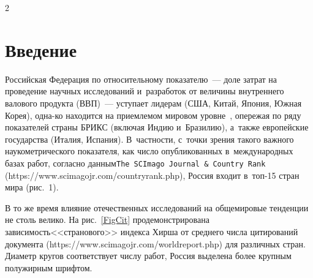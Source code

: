 
\thispagestyle{headings}

\begin{multicols}{2}

\label{st\stat}


\section{Введение}

Российская Федерация по относительному показателю~--- 
доле затрат на проведение научных исследований и~разработок от величины 
внутреннего валового продукта (ВВП)~--- уступает лидерам (США, Китай, Япония, 
Южная Корея), одна-\linebreak ко находится на приемлемом мировом уровне~\cite{GlobalRD2018}, 
опережая по ряду показателей страны БРИКС (вклю\-чая Индию и~Бразилию), 
а~также европейские государства (Италия, Испания). В~частности,\linebreak
 с~точки зрения 
такого важного наукометрического показателя, как число опубликованных\linebreak
 в~международных 
базах работ, согласно данным\linebreak \verb"The SCImago Journal & Country Rank" 
({\sf https://\linebreak www.scimagojr.com/countryrank.php}), Россия входит в~топ-15 стран мира 
(рис.~1).



В то же время влияние отечественных исследований на общемировые 
тенденции не столь велико. На рис.~\ref{FigCit} продемонстрирована 
за\-ви\-си\-мость\linebreak <<странового>> индекса Хирша от среднего 
чис\-ла цитирований документа ({\sf https://www.scimagojr.\linebreak com/worldreport.php}) 
для различных стран. Диа\-метр кругов соответствует числу работ, 
Россия выделена более крупным полужирным шрифтом.

\setcounter{figure}{1}
\begin{figure*} %
\vspace*{1pt}
 \begin{center}
 \mbox{%
 \epsfxsize=149.748mm 
 }
 \end{center}
\vspace*{-7pt}
\label{FigCit}
\vspace*{14.5pt}
\end{figure*}




\end{multicols}
